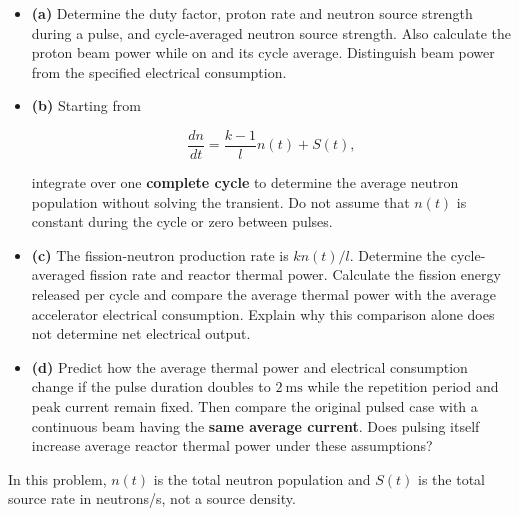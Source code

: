 \begin{itemize}
\item
  \textbf{(a)} Determine the duty factor, proton rate and neutron source
  strength during a pulse, and cycle-averaged neutron source strength.
  Also calculate the proton beam power while on and its cycle average.
  Distinguish beam power from the specified electrical consumption.
\item
  \textbf{(b)} Starting from

  \[
  \frac{dn}{dt}=\frac{k-1}{l}n(t)+S(t),
  \]

  integrate over one \textbf{complete cycle} to determine the average
  neutron population without solving the transient. Do not assume that
  \(n(t)\) is constant during the cycle or zero between pulses.
\item
  \textbf{(c)} The fission-neutron production rate is \(k n(t)/l\).
  Determine the cycle-averaged fission rate and reactor thermal power.
  Calculate the fission energy released per cycle and compare the
  average thermal power with the average accelerator electrical
  consumption. Explain why this comparison alone does not determine net
  electrical output.
\item
  \textbf{(d)} Predict how the average thermal power and electrical
  consumption change if the pulse duration doubles to \(2~\mathrm{ms}\)
  while the repetition period and peak current remain fixed. Then
  compare the original pulsed case with a continuous beam having the
  \textbf{same average current}. Does pulsing itself increase average
  reactor thermal power under these assumptions?
\end{itemize}

In this problem, \(n(t)\) is the total neutron population and \(S(t)\)
is the total source rate in neutrons/s, not a source density.


